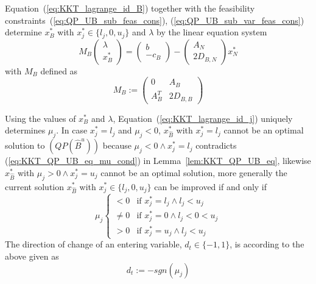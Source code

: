 \documentclass[a4paper]{article}
\begin{document}
Equation~(\ref{eq:KKT_lagrange_id_B}) together with the feasibility
constraints~(\ref{eq:QP_UB_sub_feas_cons}), (\ref{eq:QP_UB_sub_var_feas_cons})
determine $x_{B}^{*}$ with $x_{j}^{*} \in \{l_{j}, 0, u_{j}\}$ and $\lambda$ by
the linear equation system
\begin{equation}
\label{def:sol_system}
M_{B}
\left(
\begin{array}{c}
\lambda \\
\hline
x_{B}^{*}
\end{array}
\right)
=
\left(
\begin{array}{c}
b \\
\hline
-c_{B}
\end{array}
\right)
-
\left(
\begin{array}{c}
A_{N} \\
\hline
2D_{B, N}
\end{array}
\right)
x_{N}^{*}
\end{equation}
with $M_{B}$ defined as
\begin{equation}
M_{B}:=
\left(
\begin{array}{c|c}
0 & A_{B} \\
\hline
A_{B}^{T} & 2D_{B,B}
\end{array}
\right)
\end{equation}

Using the values of $x_{B}^{*}$ and $\lambda$,
Equation~(\ref{eq:KKT_lagrange_id_j}) uniquely determines $\mu_{j}$.
In case $x_{j}^{*}=l_{j}$ and $\mu_{j} < 0$, $x_{\hat{B}}^{*}$ with
$x_{j}^{*}=l_{j}$ cannot
be an optimal solution to $(QP(\hat{B}^{u}))$ because
$\mu_{j}<0 \wedge x_{j}^{*}=l_{j}$ contradicts (\ref{eq:KKT_QP_UB_eq_mu_cond})
in Lemma~\ref{lem:KKT_QP_UB_eq}, likewise $x_{\hat{B}}^{*}$ with
$\mu_{j}>0 \wedge x_{j}^{*}=u_{j}$ cannot be an optimal solution, more
generally the current solution $x_{\hat{B}}^{*}$ with
$x_{j}^{*} \in \{l_{j}, 0, u_{j}\}$ can be improved if and only if
\begin{equation}
\mu_{j}
\left\{
\begin{array}{ll}
< 0    & \text{if $x_{j}^{*}=l_{j} \wedge l_{j} < u_{j}$} \\
\neq 0 & \text{if $x_{j}^{*}=0 \wedge l_{j} < 0 < u_{j}$} \\
> 0    & \text{if $x_{j}^{*}=u_{j} \wedge l_{j} < u_{j}$}
\end{array}
\right.
\end{equation}
The direction of change of an entering variable, $d_{t} \in \{-1, 1\}$, is
according to the above given as 
\begin{equation}
\label{def:direction}
d_{t}:=-sgn(\mu_{j})
\end{equation}
\end{document}
